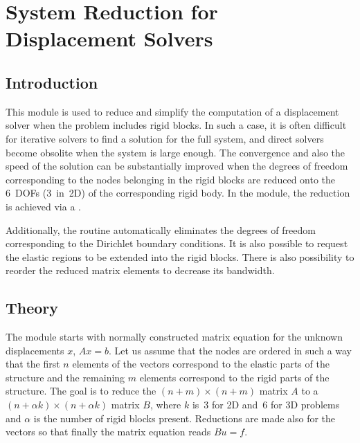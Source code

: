 \chapter{System Reduction for Displacement Solvers}



\section{Introduction}

 This module is used to reduce and simplify
the computation of a displacement solver when the problem includes
rigid blocks. In such a case, it is often difficult for iterative
solvers to find a solution for the full system, and direct solvers
become obsolite when the system is large enough. The convergence and
also the speed of the solution can be substantially improved when the
degrees of freedom corresponding to the nodes belonging in the rigid
blocks are reduced onto the 6~DOFs (3~in~2D) of the corresponding
rigid body. In the module, the reduction is achieved via a
.

Additionally, the routine automatically eliminates the degrees of
freedom corresponding to the Dirichlet boundary conditions. It is also
possible to request the elastic regions to be extended into the rigid
blocks. There is also possibility to reorder the reduced matrix
elements to decrease its bandwidth. 


\section{Theory}

The module starts with normally constructed matrix equation for the
unknown displacements $x$, $Ax=b$. Let us assume that the nodes are
ordered in such a way that the first $n$ elements of the vectors
correspond to the elastic parts of the structure and the remaining $m$
elements correspond to the rigid parts of the structure. The goal is
to reduce the $(n+m)\times (n+m)$ matrix $A$ to a $(n+\alpha k)\times
(n+\alpha k)$ matrix $B$, where $k$ is~3 for 2D and~6 for 3D problems
and $\alpha$ is the number of rigid blocks present. Reductions are
made also for the vectors so that finally the matrix equation reads
$Bu = f$.

